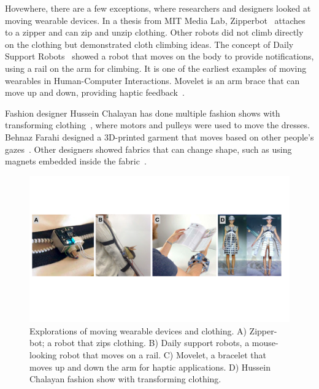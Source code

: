 Hovewhere, there are a few exceptions, where researchers and designers looked at moving wearable devices. In a thesis from MIT Media Lab, Zipperbot~\cite{whiton2013sartorial} attaches to a zipper and can zip and unzip clothing.
Other robots did not climb directly on the clothing but demonstrated cloth climbing ideas. The concept of Daily Support Robots~\cite{saga2014daily} showed a robot that moves on the body to provide notifications, using a rail on the arm for climbing. It is one of the earliest examples of moving wearables in Human-Computer Interactions. Movelet is an arm brace that can move up and down, providing haptic feedback~\cite{dobbelstein2018movelet}. 

Fashion designer Hussein Chalayan has done multiple fashion shows with transforming clothing~\cite{transformingClothing}, where motors and pulleys were used to move the dresses. Behnaz Farahi designed a 3D-printed garment that moves based on other people’s gazes~\cite{Graze}. Other designers showed fabrics that can change shape, such as using magnets embedded inside the fabric~\cite{MagneticFabric}. 

\begin{figure}[!ht]
\centering
\includegraphics[width=\textwidth]{pictures/chapter2/moving_wearables.pdf}
\caption{Explorations of moving wearable devices and clothing. A) Zipper-bot; a robot that zips clothing. B) Daily support robots, a mouse-looking robot that moves on a rail. C) Movelet, a bracelet that moves up and down the arm for haptic applications. D) Hussein Chalayan fashion show with transforming clothing. }
\label{fig:technologies_size_coverage}
\end{figure}

